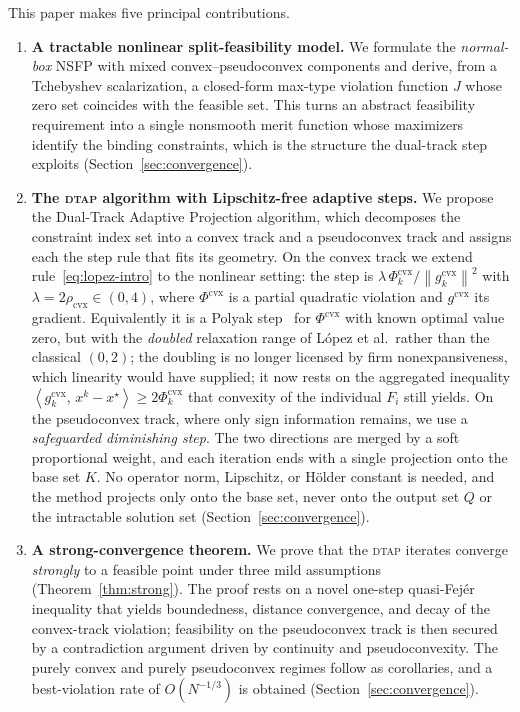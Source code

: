 \documentclass[]{interact}
\theoremstyle{plain}
\theoremstyle{definition}
\theoremstyle{remark}
\newcommand{\norm}[1]{\left\lVert #1 \right\rVert}
\newcommand{\inner}[2]{\left\langle #1,\, #2 \right\rangle}
\newcommand{\cvx}{\mathrm{cvx}}
\newcommand{\dtap}{\textsc{dtap}}
\begin{document}
This paper makes five principal contributions.
\begin{enumerate}[label=\textbf{C\arabic*.},leftmargin=2.4em,itemsep=4pt]
\item \textbf{A tractable nonlinear split-feasibility model.} We formulate the \emph{normal-box} NSFP with mixed convex--pseudoconvex components and derive, from a Tchebyshev scalarization, a closed-form max-type violation function $J$ whose zero set coincides with the feasible set. This turns an abstract feasibility requirement into a single nonsmooth merit function whose maximizers identify the binding constraints, which is the structure the dual-track step exploits (Section~\ref{sec:convergence}).
\item \textbf{The \dtap{} algorithm with Lipschitz-free adaptive steps.} We propose the Dual-Track Adaptive Projection algorithm, which decomposes the constraint index set into a convex track and a pseudoconvex track and assigns each the step rule that fits its geometry. On the convex track we extend rule~\eqref{eq:lopez-intro} to the nonlinear setting: the step is $\lambda\,\Phi^{\cvx}_k/\norm{g^{\cvx}_k}^2$ with $\lambda=2\rho_{\cvx}\in(0,4)$, where $\Phi^{\cvx}$ is a partial quadratic violation and $g^{\cvx}$ its gradient. Equivalently it is a Polyak step~\citep{polyak1969} for $\Phi^{\cvx}$ with known optimal value zero, but with the \emph{doubled} relaxation range of L\'opez et al.\ rather than the classical $(0,2)$; the doubling is no longer licensed by firm nonexpansiveness, which linearity would have supplied; it now rests on the aggregated inequality $\inner{g^{\cvx}_k}{x^k-x^\star}\ge2\Phi^{\cvx}_k$ that convexity of the individual $F_i$ still yields. On the pseudoconvex track, where only sign information remains, we use a \emph{safeguarded diminishing step}. The two directions are merged by a soft proportional weight, and each iteration ends with a single projection onto the base set $K$. No operator norm, Lipschitz, or H\"older constant is needed, and the method projects only onto the base set, never onto the output set $Q$ or the intractable solution set (Section~\ref{sec:convergence}).
\item \textbf{A strong-convergence theorem.} We prove that the \dtap{} iterates converge \emph{strongly} to a feasible point under three mild assumptions (Theorem~\ref{thm:strong}). The proof rests on a novel one-step quasi-Fej\'er inequality that yields boundedness, distance convergence, and decay of the convex-track violation; feasibility on the pseudoconvex track is then secured by a contradiction argument driven by continuity and pseudoconvexity. The purely convex and purely pseudoconvex regimes follow as corollaries, and a best-violation rate of $O(N^{-1/3})$ is obtained (Section~\ref{sec:convergence}).

\end{enumerate}
\end{document}
